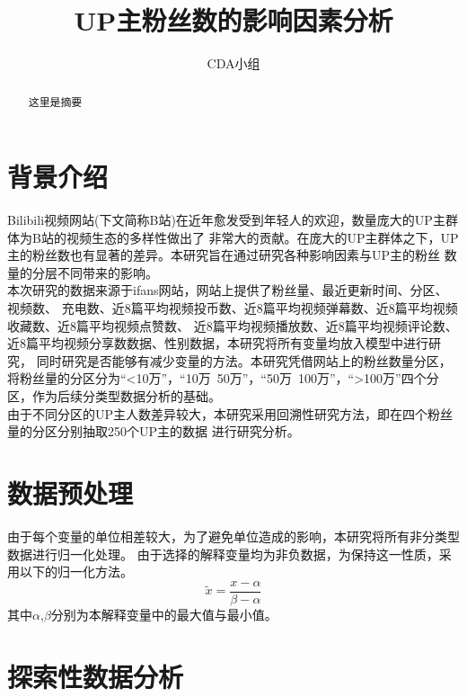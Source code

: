 \documentclass{ctexart}
\title{UP主粉丝数的影响因素分析}
\author{CDA小组}
\date{}
\begin{document}
\maketitle
\begin{abstract}
    这里是摘要
\end{abstract}
\tableofcontents
\newpage
\section{背景介绍}
Bilibili视频网站(下文简称B站)在近年愈发受到年轻人的欢迎，数量庞大的UP主群体为B站的视频生态的多样性做出了
非常大的贡献。在庞大的UP主群体之下，UP主的粉丝数也有显著的差异。本研究旨在通过研究各种影响因素与UP主的粉丝
数量的分层不同带来的影响。\\
\indent 本次研究的数据来源于ifans网站，网站上提供了粉丝量、最近更新时间、分区、视频数、
充电数、近8篇平均视频投币数、近8篇平均视频弹幕数、近8篇平均视频收藏数、近8篇平均视频点赞数、
近8篇平均视频播放数、近8篇平均视频评论数、近8篇平均视频分享数数据、性别数据，本研究将所有变量均放入模型中进行研究，
同时研究是否能够有减少变量的方法。本研究凭借网站上的粉丝数量分区，
将粉丝量的分区分为“<10万”，“10万~50万”，“50万~100万”，“>100万”四个分区，作为后续分类型数据分析的基础。\\
\indent 由于不同分区的UP主人数差异较大，本研究采用回溯性研究方法，即在四个粉丝量的分区分别抽取250个UP主的数据
进行研究分析。
\section{数据预处理}
由于每个变量的单位相差较大，为了避免单位造成的影响，本研究将所有非分类型数据进行归一化处理。
由于选择的解释变量均为非负数据，为保持这一性质，采用以下的归一化方法。
\begin{equation}
    \tilde{x} = \frac{x-\alpha}{\beta - \alpha}
\end{equation}
其中$\alpha$,$\beta$分别为本解释变量中的最大值与最小值。
\section{探索性数据分析}
\end{document}
